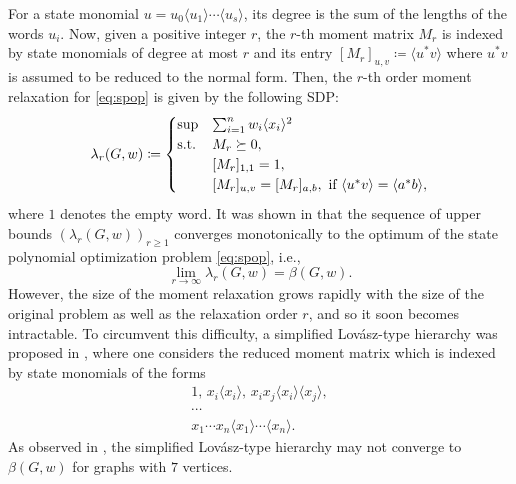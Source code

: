 For a state monomial $u=u_0\langle u_1\rangle\cdots\langle u_s\rangle$, its degree is the sum of the lengths of the words $u_i$. Now, given a positive integer $r$, the $r$-th moment matrix $M_r$ is indexed by state monomials of degree at most $r$ and its entry $[M_r]_{u,v}\coloneqq\langle u^*v\rangle$ where $u^*v$ is assumed to be reduced to the normal form. Then, the $r$-th order moment relaxation for \eqref{eq:spop} is given by the following SDP:
\begin{equation}\label{mom}
\lambda_r(G,w)\coloneqq\begin{cases}
\sup &\sum_{i=1}^n w_i\langle x_i\rangle^2\\
\rm{s.t.}&M_r\succeq0,\\
&[M_r]_{1,1}=1,\\
&[M_r]_{u,v}=[M_r]_{a,b}, \text{ if }\langle u^*v\rangle=\langle a^*b\rangle,
\end{cases}
\end{equation}
where $1$ denotes the empty word. It was shown in \cite{klep2024state} that the sequence of upper bounds $(\lambda_r(G,w))_{r\ge1}$ converges monotonically to the optimum of the state polynomial optimization problem \eqref{eq:spop}, i.e., $$\lim_{r\to\infty}\lambda_r(G,w)=\beta(G,w).$$
However, the size of the moment relaxation grows rapidly with the size of the original problem as well as the relaxation order $r$, and so it soon becomes intractable. To circumvent this difficulty, a simplified Lov\'asz-type hierarchy was proposed in \cite{moran2024Uncertainty}, where one considers the reduced moment matrix which is indexed by state monomials of the forms
\begin{gather}
1,\,x_{i}\langle x_{i}\rangle,\,x_{i}x_{j}\langle x_{i}\rangle\langle x_{j}\rangle,\nonumber\\
\cdots\label{lovasz}\\
x_{1}\cdots x_{n}\langle x_{1}\rangle\cdots\langle x_{n}\rangle\nonumber.
\end{gather}
As observed in \cite{moran2024Uncertainty}, the simplified Lov\'asz-type hierarchy may not converge to $\beta(G,w)$ for graphs with $7$ vertices.

